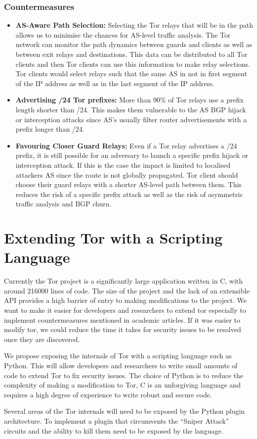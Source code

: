 \documentclass[9pt,technote]{IEEEtran}
\begin{document}
\subsubsection{Countermeasures}
\begin{itemize}
\item \textbf{AS-Aware Path Selection:} Selecting the Tor relays that will be in
	the path allows us to minimise the chances for AS-level traffic
	analysis. The Tor network can monitor the path dynamics between guards
	and clients as well as between exit relays and destinations. This data
	can be distributed to all Tor clients and then Tor clients can use this
	information to make relay selections. Tor clients would select relays
	such that the same AS in not in first segment of the IP address as well
	as in the last segment of the IP address.
\item \textbf{Advertising /24 Tor prefixes:} More than 90\% of Tor relays use a
	prefix length shorter than /24. This makes them vulnerable to the AS BGP
	hijack or interception attacks since AS's usually filter router
	advertisements with a prefix longer than /24.
\item \textbf{Favouring Closer Guard Relays:} Even if a Tor relay advertises a
	/24 prefix, it is still possible for an adversary to launch a specific
	prefix hijack or interception attack. If this is the case the impact is
	limited to localised attackers AS since the route is not globally
	propagated. Tor client should choose their guard relays with a shorter
	AS-level path between them. This reduces the risk of a specific prefix
	attack as well as the risk of asymmetric traffic analysis and BGP churn.
\end{itemize}


\section{Extending Tor with a Scripting Language}
Currently the Tor project is a significantly large application written in C,
with around 216000 lines of code. The size of the project and the lack of an
extensible API provides a high barrier of entry to making modifications to the
project. We want to make it easier for developers and researchers to extend tor
especially to implement countermeasures mentioned in academic articles. If it
was easier to modify tor, we could reduce the time it takes for security issues
to be resolved once they are discovered.

We propose exposing the internals of Tor with a scripting language such as
Python. This will allow developers and researchers to write small amounts of code to extend Tor to fix security issues. The choice of Python is to reduce the complexity of making a modification to Tor, C is an unforgiving language and requires a high degree of experience to write robust and secure code.

Several areas of the Tor internals will need to be exposed by the Python plugin
architecture. To implement a plugin that circumvents the ``Sniper Attack''
circuits and the ability to kill them need to be exposed by the language.



\end{document}
